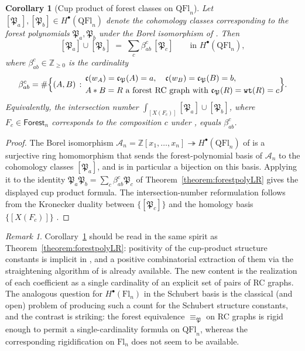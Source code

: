 \documentclass{amsart}
\newtheorem{corollary}[lemma]{Corollary}
\theoremstyle{definition}
\theoremstyle{remark}
\newtheorem*{remark}{Remark}
\numberwithin{equation}{subsection}
\newcommand{\wof}[1]{w_{#1}}
\newcommand{\wtt}{\mathtt{wt}}
\newcommand{\coma}{\mathcal{A}}
\newcommand{\code}{\mathfrak{c}}
\newcommand{\forest}{\mathfrak{P}}
\begin{document}
\begin{corollary}[Cup product of forest classes on $\mathrm{QFl}_n$]\label{corollary:cupforest}
Let $[\forest_a], [\forest_b]\in H^\bullet(\mathrm{QFl}_n)$ denote the cohomology classes corresponding to the forest polynomials $\forest_a, \forest_b$ under the Borel isomorphism of \cite[Theorem~A]{bergeron2025qsymflag}. Then
$$[\forest_a]\cup [\forest_b] \;=\; \sum_c \beta_{ab}^c\,[\forest_c]\qquad\text{in } H^\bullet(\mathrm{QFl}_n),$$
where $\beta_{ab}^c\in\mathbb{Z}_{\geq 0}$ is the cardinality
$$
\beta_{ab}^c = \#\Bigl\{(A,B)\,:\,
\begin{aligned}
&\code(\wof{A})=\code_\forest(A)=a,\quad \code(\wof{B})=\code_\forest(B)=b,\\
&A*B=R \text{ a forest RC graph with } \code_\forest(R)=\wtt(R)=c
\end{aligned}
\Bigr\}.
$$
Equivalently, the intersection number $\int_{[X(F_c)]} [\forest_a]\cup [\forest_b]$, where $F_c\in\mathsf{Forest}_n$ corresponds to the composition $c$ under \cite[Corollary~11.6, Theorem~12.12]{bergeron2025qsymflag}, equals $\beta_{ab}^c$.
\end{corollary}

\begin{proof}
The Borel isomorphism $\coma_n=\mathbb{Z}[x_1,\ldots,x_n]\twoheadrightarrow H^\bullet(\mathrm{QFl}_n)$ of \cite[Theorem~A and Corollary~12.5]{bergeron2025qsymflag} is a surjective ring homomorphism that sends the forest-polynomial basis of $\coma_n$ to the cohomology classes $[\forest_a]$, and is in particular a bijection on this basis. Applying it to the identity $\forest_a\forest_b = \sum_c \beta_{ab}^c \forest_c$ of Theorem~\ref{theorem:forestpolyLR} gives the displayed cup product formula. The intersection-number reformulation follows from the Kronecker duality between $\{[\forest_c]\}$ and the homology basis $\{[X(F_c)]\}$ \cite[Theorem~12.12]{bergeron2025qsymflag}.
\end{proof}

\begin{remark}
Corollary~\ref{corollary:cupforest} should be read in the same spirit as Theorem~\ref{theorem:forestpolyLR}: positivity of the cup-product structure constants is implicit in \cite{bergeron2025equivariant,bergeron2025qsymflag}, and a positive combinatorial extraction of them via the straightening algorithm of \cite{bergeron2025equivariant} is already available. The new content is the realization of each coefficient as a single cardinality of an explicit set of pairs of RC graphs. The analogous question for $H^\bullet(\mathrm{Fl}_n)$ in the Schubert basis is the classical (and open) problem of producing such a count for the Schubert structure constants, and the contrast is striking: the forest equivalence $\equiv_\forest$ on RC graphs is rigid enough to permit a single-cardinality formula on $\mathrm{QFl}_n$, whereas the corresponding rigidification on $\mathrm{Fl}_n$ does not seem to be available.
\end{remark}
\end{document}

